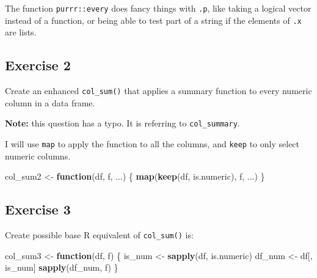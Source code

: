 \documentclass[]{book}
\newenvironment{Shaded}{\begin{snugshade}}{\end{snugshade}}
\newcommand{\CommentTok}[1]{\textcolor[rgb]{0.56,0.35,0.01}{\textit{#1}}}
\newcommand{\ControlFlowTok}[1]{\textcolor[rgb]{0.13,0.29,0.53}{\textbf{#1}}}
\newcommand{\KeywordTok}[1]{\textcolor[rgb]{0.13,0.29,0.53}{\textbf{#1}}}
\newcommand{\NormalTok}[1]{#1}
\newcommand{\StringTok}[1]{\textcolor[rgb]{0.31,0.60,0.02}{#1}}
\theoremstyle{definition}
\theoremstyle{definition}
\theoremstyle{definition}
\theoremstyle{remark}
\begin{document}
The function \texttt{purrr::every} does fancy things with \texttt{.p},
like taking a logical vector instead of a function, or being able to
test part of a string if the elements of \texttt{.x} are lists.

\hypertarget{exercise-2-55}{%
\subsection{Exercise 2}\label{exercise-2-55}}

Create an enhanced \texttt{col\_sum()} that applies a summary function
to every numeric column in a data frame.

\textbf{Note:} this question has a typo. It is referring to
\texttt{col\_summary}.

I will use \texttt{map} to apply the function to all the columns, and
\texttt{keep} to only select numeric columns.

\begin{Shaded}
\begin{Highlighting}[]
\NormalTok{col_sum2 <-}\StringTok{ }\ControlFlowTok{function}\NormalTok{(df, f, ...) \{}
  \KeywordTok{map}\NormalTok{(}\KeywordTok{keep}\NormalTok{(df, is.numeric), f, ...)}
\NormalTok{\}}
\end{Highlighting}
\end{Shaded}

\begin{Shaded}
\end{Shaded}

\hypertarget{exercise-3-41}{%
\subsection{Exercise 3}\label{exercise-3-41}}

Create possible base R equivalent of \texttt{col\_sum()} is:

\begin{Shaded}
\begin{Highlighting}[]
\NormalTok{col_sum3 <-}\StringTok{ }\ControlFlowTok{function}\NormalTok{(df, f) \{}
\NormalTok{  is_num <-}\StringTok{ }\KeywordTok{sapply}\NormalTok{(df, is.numeric)}
\NormalTok{  df_num <-}\StringTok{ }\NormalTok{df[, is_num]}
  \KeywordTok{sapply}\NormalTok{(df_num, f)}
\NormalTok{\}}
\end{Highlighting}
\end{Shaded}
\end{document}
